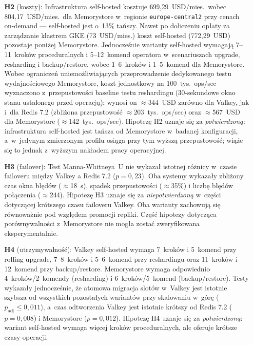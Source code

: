 \textbf{H2} (koszty): Infrastruktura self-hosted kosztuje 699{,}29~USD/mies.\ wobec 804{,}17~USD/mies.\ dla Memorystore w~regionie \texttt{europe-central2} przy cenach on-demand --- self-hosted jest o~13\% tańszy. Nawet po doliczeniu opłaty za zarządzanie klastrem GKE (73~USD/mies.) koszt self-hosted (772{,}29~USD) pozostaje poniżej Memorystore. Jednocześnie warianty self-hosted wymagają 7--11~kroków proceduralnych i 5--12~komend operatora w~scenariuszach upgrade, resharding i backup/restore, wobec 1--6~kroków i 1--5~komend dla Memorystore. Wobec ograniczeń uniemożliwiających przeprowadzenie dedykowanego testu wydajnościowego Memorystore, koszt jednostkowy na 100~tys.\ ops/sec wyznaczono z~przepustowości baseline testu reshardingu (30-sekundowe okno stanu ustalonego przed operacją): wynosi on $\approx$344~USD zarówno dla Valkey, jak i~dla Redis 7.2 (zbliżona przepustowość $\approx$203~tys.\ ops/sec) oraz $\approx$567~USD dla Memorystore ($\approx$142~tys.\ ops/sec). Hipotezę H2 uznaje się za \textit{potwierdzoną}: infrastruktura self-hosted jest tańsza od Memorystore w~badanej konfiguracji, a~w~jedynym zmierzonym profilu osiąga przy tym wyższą przepustowość; wiąże się to jednak z~wyższym nakładem pracy operacyjnej.

\textbf{H3} (failover): Test Manna-Whitneya~U nie wykazał istotnej różnicy w~czasie failoveru między Valkey a Redis 7.2 ($p = 0{,}23$). Oba systemy wykazały zbliżony czas okna błędów ($\approx$18~s), spadek przepustowości ($\approx$35\%) i liczbę błędów połączenia ($\approx$244). Hipotezę H3 uznaje się za \textit{niepotwierdzoną} w~części dotyczącej krótszego czasu failoveru Valkey. Oba warianty zachowują się równoważnie pod względem promocji repliki. Część hipotezy dotycząca porównywalności z~Memorystore nie mogła zostać zweryfikowana eksperymentalnie.

\textbf{H4} (utrzymywalność): Valkey self-hosted wymaga 7~kroków i 5~komend przy rolling upgrade, 7--8~kroków i 5--6~komend przy reshardingu oraz 11~kroków i 12~komend przy backup/restore. Memorystore wymaga odpowiednio 4~kroków/2~komendy (resharding) i 6~kroków/5~komend (backup/restore). Testy wykazały jednocześnie, że atomowa migracja slotów w~Valkey jest istotnie szybsza od wszystkich pozostałych wariantów przy skalowaniu w~górę ($p_{\mathrm{adj}} \leq 0{,}011$), a~czas odtworzenia Valkey jest istotnie krótszy od Redis 7.2 ($p = 0{,}008$) i Memorystore ($p = 0{,}012$). Hipotezę H4 uznaje się za \textit{potwierdzoną}: wariant self-hosted wymaga więcej kroków proceduralnych, ale oferuje krótsze czasy operacji.

